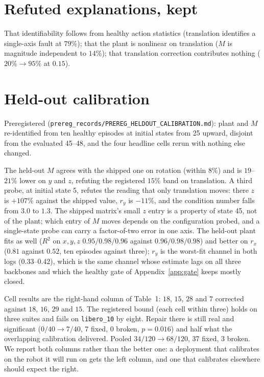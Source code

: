 \documentclass{article}
\newcommand{\code}[1]{\texttt{\small #1}}
\begin{document}
\section{Refuted explanations, kept}
\label{app:refuted}
 That identifiability follows from healthy action
statistics (translation identifies a single-axis fault at $79\%$); that the plant is nonlinear
on translation ($M$ is magnitude independent to $14\%$); that translation correction
contributes nothing ($20\%\to95\%$ at $0.15$).

\section{Held-out calibration}
\label{app:heldout}
Preregistered (\code{prereg\_records/PREREG\_HELDOUT\_CALIBRATION.md}): plant and $M$
re-identified from ten healthy episodes at initial states from 25 upward, disjoint from the
evaluated 45--48, and the four headline cells rerun with nothing else changed.

The held-out $M$ agrees with the shipped one on rotation (within $8\%$) and is $19$--$21\%$
lower on $y$ and $z$, refuting the registered $15\%$ band on translation. A third probe, at
initial state 5, refutes the reading that only translation moves: there $z$ is $+107\%$ against
the shipped value, $r_y$ is $-11\%$, and the condition number falls from $3.0$ to $1.3$. The
shipped matrix's small $z$ entry is a property of state 45, not of the plant; which entry of
$M$ moves depends on the configuration probed, and a single-state probe can carry a
factor-of-two error in one axis. The
held-out plant fits as well ($R^2$ on $x,y,z$ $0.95/0.98/0.96$ against $0.96/0.98/0.98$) and
better on $r_x$ ($0.81$ against $0.52$, ten episodes against three); $r_y$ is the worst-fit
channel in both logs ($0.33$--$0.42$), which is the same channel whose estimate lags on all
three backbones and which the healthy gate of Appendix~\ref{app:gate} keeps mostly closed.

Cell results are the right-hand column of Table~1: $18$, $15$, $28$ and $7$ corrected against
$18$, $16$, $29$ and $15$. The registered bound (each cell within three) holds on three suites
and fails on \code{libero\_10} by eight. Repair there is still real and significant ($0/40\to7/40$,
7 fixed, 0 broken, $p=0.016$) and half what the overlapping calibration delivered. Pooled
$34/120\to68/120$, 37 fixed, 3 broken. We report both columns rather than the better one: a
deployment that calibrates on the robot it will run on gets the left column, and one that
calibrates elsewhere should expect the right.
\end{document}
